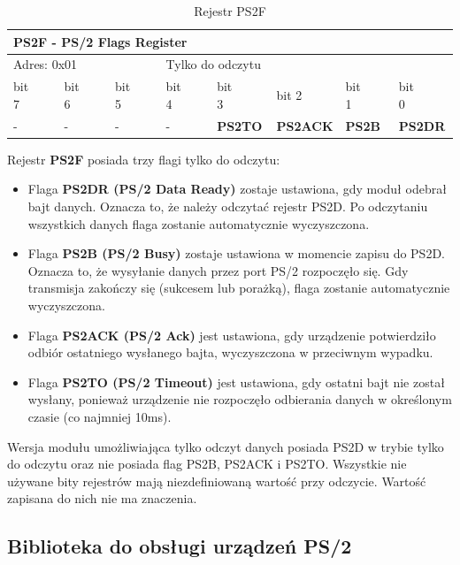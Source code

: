 \begin{table}[h]
	\begin{center}
	{\footnotesize
		\begin{tabular}{|l|l|l|l|l|l|l|l|}
			\hline
			\multicolumn{8}{|l|}{ \textbf{PS2F - PS/2 Flags Register} } \\
			\hline
			\multicolumn{3}{|l}{ Adres: 0x01 } & \multicolumn{5}{l|}{ Tylko do odczytu } \\
			\hline
			\hline bit 7~~~~ & bit 6~~~~ & bit 5~~~~ & bit 4~~~~ & bit 3~~~~ & bit 2~~~~ & bit 1~~~~ & bit 0~~~~ \\				
			\hline - & - & -& - & \textbf{PS2TO} & \textbf{PS2ACK} & \textbf{PS2B} & \textbf{PS2DR} \\				
			\hline
		\end{tabular}}
		\caption{ Rejestr PS2F }
		\label{tab:regPS2F}
	\end{center}
\end{table}


Rejestr \textbf{PS2F} posiada trzy flagi tylko do odczytu:
\begin{itemize}
	\item Flaga \textbf{PS2DR (PS/2 Data Ready)} zostaje ustawiona, gdy moduł odebrał bajt danych. Oznacza to, że należy odczytać rejestr PS2D. Po odczytaniu wszystkich danych flaga zostanie automatycznie wyczyszczona.
	\item Flaga \textbf{PS2B (PS/2 Busy)} zostaje ustawiona w momencie zapisu do PS2D. Oznacza to, że wysyłanie danych przez port PS/2 rozpoczęło się. Gdy transmisja zakończy się (sukcesem lub porażką), flaga zostanie automatycznie wyczyszczona.
	\item Flaga \textbf{PS2ACK (PS/2 Ack)} jest ustawiona, gdy urządzenie potwierdziło odbiór ostatniego wysłanego bajta, wyczyszczona w przeciwnym wypadku.
	\item Flaga \textbf{PS2TO (PS/2 Timeout)} jest ustawiona, gdy ostatni bajt nie został wysłany, ponieważ urządzenie nie rozpoczęło odbierania danych w określonym czasie (co najmniej 10ms).
\end{itemize}


Wersja modułu umożliwiająca tylko odczyt danych posiada PS2D w trybie tylko do odczytu oraz nie posiada flag PS2B, PS2ACK i PS2TO. Wszystkie nie używane bity rejestrów mają niezdefiniowaną wartość przy odczycie. Wartość zapisana do nich nie ma znaczenia.

\subsection{Biblioteka do obsługi urządzeń PS/2}

